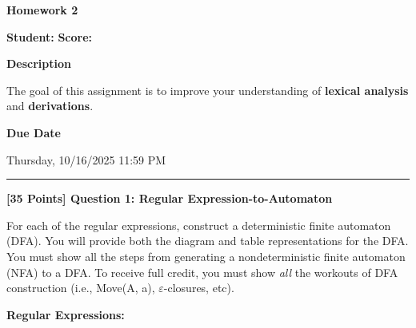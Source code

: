\documentclass[12pt]{article}
\begin{document}
\begin{center}
    \vspace*{0.5cm}
    {\LARGE \textbf{Homework 2}}\\[1em]
\end{center}

\noindent\textbf{Student:} \underline{} \hfill
\textbf{Score:} \underline{\makebox[3cm][l]{}}

\vspace{1.5em}

\noindent\textbf{Description}

\noindent The goal of this assignment is to improve your understanding of \textbf{lexical analysis} and \textbf{derivations}.

\vspace{1em}

\noindent\textbf{Due Date}

\noindent Thursday, 10/16/2025 11:59 PM

\vspace{1.5em}
\hrule
\vspace{1em}

\noindent\textbf{[35 Points] Question 1: Regular Expression-to-Automaton}

\noindent For each of the regular expressions, construct a deterministic finite automaton (DFA). You will provide both the diagram and table representations for the DFA. You must show all the steps from generating a nondeterministic finite automaton (NFA) to a DFA. To receive full credit, you must show \textit{all} the workouts of DFA construction (i.e., Move(A, a), $\varepsilon$-closures, etc).

\vspace{1em}
\noindent\textbf{Regular Expressions:}
\end{document}
